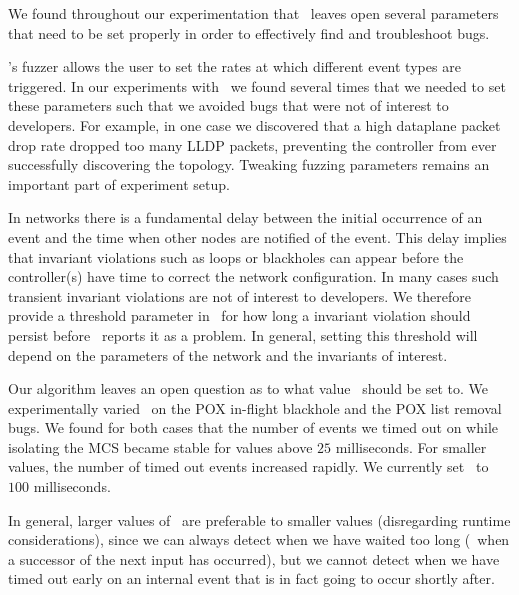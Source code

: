 We found throughout our experimentation that \projectname~leaves open several
parameters that need to be set properly in order to effectively find and troubleshoot bugs.

 \projectname's fuzzer allows the
user to set the rates at which different event types are triggered. In our experiments with
\projectname~we found several times that we needed to set these parameters
such that we avoided bugs that were not of interest to developers.
For example, in one case we discovered that a high dataplane
packet drop rate dropped too many LLDP packets, preventing the controller from ever successfully discovering the topology.
Tweaking fuzzing parameters remains an important
part of experiment setup.

 In
networks there is a fundamental delay between the initial occurrence of an
event and the time when other nodes are notified of the event. This delay implies
that invariant violations such as loops or blackholes can appear
before the controller(s) have time to correct the network configuration. In
many cases such transient invariant violations are not of interest to
developers. We therefore provide a threshold parameter in \projectname~for
how long a invariant violation should persist before
\projectname~reports it as a problem. In general, setting this
threshold will depend on the parameters of the network and the invariants of
interest.

 Our algorithm leaves an open question as to what value
\textepsilon~should be set to. We experimentally varied \textepsilon~on the
POX in-flight blackhole and the POX list removal bugs.
We found for both cases that the number of events we timed out on while isolating the MCS became stable for values above $25$ milliseconds.
For smaller values, the number of timed out events increased rapidly. We
currently set \textepsilon~to $100$ milliseconds.

In general, larger values of \textepsilon~are preferable to
smaller values (disregarding runtime considerations), since we can always
detect when we have waited too long (\viz~when a successor of the next input
has occurred), but we cannot detect when we have timed out
early on an internal event that is in fact going to occur shortly after.

